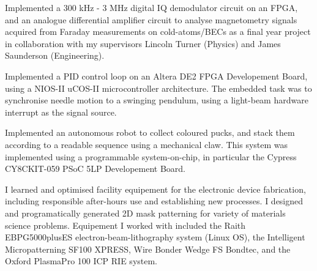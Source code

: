 \documentclass[10pt,a4paper,ragged2e,withhyper]{altacv}
\begin{document}
		\divider
		
		Implemented a 300 kHz - 3 MHz digital IQ demodulator circuit on an FPGA, and an analogue differential amplifier circuit
		to analyse magnetometry signals acquired from Faraday measurements on cold-atoms/BECs as a final year project in collaboration with
		my supervisors Lincoln Turner (Physics) and James Saunderson (Engineering).

		\divider


		Implemented a PID control loop on an Altera DE2 FPGA Developement Board, using a NIOS-II uCOS-II microcontroller architecture. 
		The embedded task was to synchronise needle motion to a swinging pendulum, using a light-beam hardware interrupt as the signal source.

		\divider


		Implemented an autonomous robot to collect coloured pucks, and stack them according to a readable sequence using a mechanical claw.
		This system was implemented using a programmable system-on-chip, in particular the Cypress CY8CKIT-059 PSoC 5LP Developement Board.

		\divider

		I learned and optimised facility equipement for the electronic device fabrication, including responsible after-hours use and establishing new processes.
		I designed and programatically generated 2D mask patterning for variety of materials science problems.  
		Equipement I worked with included the Raith EBPG5000plusES electron-beam-lithography system (Linux OS), 
		the Intelligent Micropatterning SF100 XPRESS, Wire Bonder Wedge FS Bondtec, and the Oxford PlasmaPro 100 ICP RIE system.

			
\end{document}
